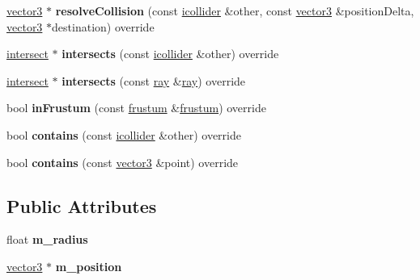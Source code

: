 \begin{DoxyCompactItemize}
\mbox{\label{classflounder_1_1sphere_af04afaeb7731499715eed184dd0d5871}} 
\hyperlink{classflounder_1_1vector3}{vector3} $\ast$ {\bfseries resolve\+Collision} (const \hyperlink{classflounder_1_1icollider}{icollider} \&other, const \hyperlink{classflounder_1_1vector3}{vector3} \&position\+Delta, \hyperlink{classflounder_1_1vector3}{vector3} $\ast$destination) override
\item 
\mbox{\label{classflounder_1_1sphere_aeda4bb2ba79f620b175863bf9eaa3879}} 
\hyperlink{classflounder_1_1intersect}{intersect} $\ast$ {\bfseries intersects} (const \hyperlink{classflounder_1_1icollider}{icollider} \&other) override
\item 
\mbox{\label{classflounder_1_1sphere_a2622ae996a73b39d9836bba2e0d43916}} 
\hyperlink{classflounder_1_1intersect}{intersect} $\ast$ {\bfseries intersects} (const \hyperlink{classflounder_1_1ray}{ray} \&\hyperlink{classflounder_1_1ray}{ray}) override
\item 
\mbox{\label{classflounder_1_1sphere_a9f926b8c9952282c9f6d251e163e7cbd}} 
bool {\bfseries in\+Frustum} (const \hyperlink{classflounder_1_1frustum}{frustum} \&\hyperlink{classflounder_1_1frustum}{frustum}) override
\item 
\mbox{\label{classflounder_1_1sphere_a47fbf32870b7380f5eacc795119866fb}} 
bool {\bfseries contains} (const \hyperlink{classflounder_1_1icollider}{icollider} \&other) override
\item 
\mbox{\label{classflounder_1_1sphere_a357fe4e2124576134bba850bd308b2d5}} 
bool {\bfseries contains} (const \hyperlink{classflounder_1_1vector3}{vector3} \&point) override
\end{DoxyCompactItemize}
\subsection*{Public Attributes}
\begin{DoxyCompactItemize}
\item 
\mbox{\label{classflounder_1_1sphere_aac64797b8fe65b438f51d9eedce60df7}} 
float {\bfseries m\+\_\+radius}
\item 
\mbox{\label{classflounder_1_1sphere_ab1f889c31c7f5eb9265fa91feae23a84}} 
\hyperlink{classflounder_1_1vector3}{vector3} $\ast$ {\bfseries m\+\_\+position}
\end{DoxyCompactItemize}


